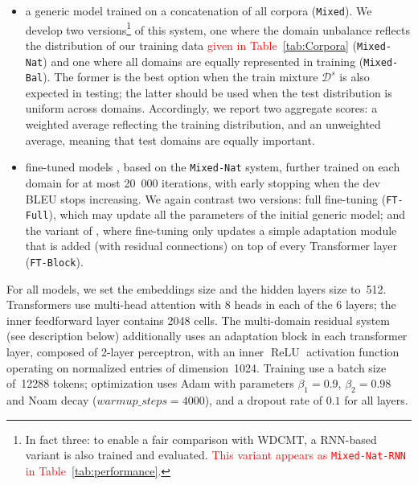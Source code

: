\documentclass[11pt,a4paper]{article}
\newcommand{\fyDone}[1]{\done[FY]\Todo[FY:]{\textcolor{orange}{#1}}}
\newcommand{\jcDone}[1]{\done[JC]\Todo[JC:]{\textcolor{red}{#1}}}
\newcommand{\revision}[1]{\textcolor{red}{#1}}
\newcommand{\system}[1]{\texttt{{#1}}}
\begin{document}
\begin{itemize}
\item a generic model trained on a concatenation of all corpora (\texttt{Mixed}). We develop two versions\footnote{In fact three: to enable a fair comparison with WDCMT, a RNN-based variant is also trained and evaluated. \revision{This variant appears as \system{Mixed-Nat-RNN} in Table~\ref{tab:performance}}.} of this system, one where the domain unbalance reflects the distribution of our training data \revision{given in Table~\ref{tab:Corpora}} (\system{Mixed-Nat}) and one where all domains are equally represented in training (\system{Mixed-Bal}). The former is the best option when the train mixture $\mathcal{D}^s$ is also expected in testing; the latter should be used when the test distribution is uniform across domains. Accordingly, we report two aggregate scores: a weighted average reflecting the training distribution, and an unweighted average, meaning that test domains are equally important.
\item fine-tuned models \cite{Luong15stanford,Freitag16fast}\jcDone{i would use Luong and Manning 2015}, based on the \system{Mixed-Nat} system, further trained on each domain for at most 20~000 iterations, with early stopping when the dev BLEU stops increasing. We again contrast two versions: full fine-tuning (\system{FT-Full}), which may update all the parameters of the initial generic model; and the variant of \cite{Bapna19simple}, where fine-tuning only updates a simple adaptation module that is added (with residual connections) on top of every Transformer layer (\system{FT-Block}).
\end{itemize}

For all models, we set the embeddings size and the hidden layers size to~512. Transformers use multi-head attention with 8 heads in each of the 6 layers; the inner feedforward layer contains 2048 cells. The multi-domain residual system (see description below) additionally uses an adaptation block in each transformer layer, composed of 2-layer perceptron, with an inner $\operatorname{ReLU}$ activation function operating on normalized entries of dimension~1024. 
Training use a batch size of~12288 tokens; optimization uses Adam with parameters $\beta_1=0.9$, $\beta_2= 0.98$ and Noam decay ($warmup\_steps=4000$), and a dropout rate of $0.1$ for all layers.\fyDone{Describe the block adaptation layer - voir slides} 
\end{document}
